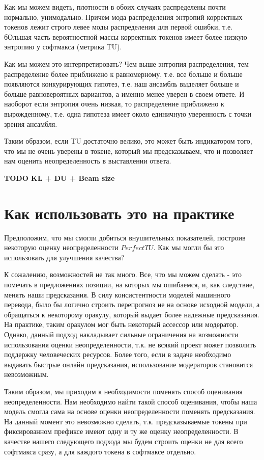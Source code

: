 \documentclass[a4paper,14pt]{extarticle}
\begin{document}
	Как мы можем видеть, плотности в обоих случаях распределены почти нормально, унимодально. Причем мода распределения энтропий корректных токенов лежит строго левее моды распределения для первой ошибки, т.е. бОльшая часть вероятностной массы корректных токенов имеет более низкую энтропию у софтмакса (метрика TU). 
	
	Как мы можем это интерпретировать? Чем выше энтропия распределения, тем распределение более приближено к равномерному, т.е. все больше и больше появляются конкурирующих гипотез, т.е. наш ансамбль выделяет больше и больше равновероятных вариантов, а именно менее уверен в своем ответе. И наоборот если энтропия очень низкая, то распределение приближено к вырожденному, т.е. одна гипотеза имеет около единичную уверенность с точки зрения ансамбля. 
	
	Таким образом, если TU достаточно велико, это может быть индикатором того, что мы не очень уверены в токене, который мы предсказываем, что и позволяет нам оценить неопределенность в выставлении ответа.
	
	\textbf{TODO KL + DU + Beam size}
	
\section{Как использовать это на практике}
	Предположим, что мы смогли добиться внушительных показателей, построив некоторую оценку неопределенности $PerfectTU$. Как мы могли бы это использовать для улучшения качества?
	
	К сожалению, возможностей не так много. Все, что мы можем сделать - это помечать в предложениях позиции, на которых мы ошибаемся, и, как следствие, менять наши предсказания. В силу консистентности моделей машинного перевода, было бы логично строить перепрогноз не на основе исходной модели, а обращаться к некоторому оракулу, который выдает более надежные предсказания. На практике, таким оракулом мог быть некоторый ассессор или модератор. Однако, данный подход накладывает сильные ограничения на возможности использования оценки неопределенности, т.к. не всякий проект может позволить поддержку человеческих ресурсов. Более того, если в задаче необходимо выдавать быстрые онлайн предсказания, использование модераторов становится невозможным.
	
	Таким образом, мы приходим к необходимости поменять способ оценивания неопределенности. Нам необходимо найти такой способ оценивания, чтобы наша модель смогла сама на основе оценки неопределенности поменять предсказания. На данный момент это невозможно сделать, т.к. предсказываемые токены при фиксированном префиксе имеют одну и ту же оценку неопределенности. В качестве нашего следующего подхода мы будем строить оценки не для всего софтмакса сразу, а для каждого токена в софтмаксе отдельно.
	
\end{document}
